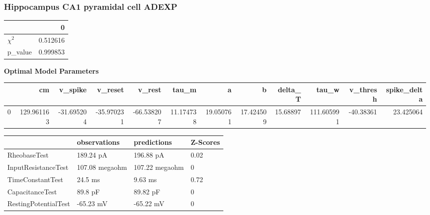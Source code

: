 \subsubsection{Hippocampus CA1 pyramidal cell ADEXP}\begin{tabular}{lr}
\toprule
{} &         0 \\
\midrule
$\chi^{2}$ &  0.512616 \\
p\_value    &  0.999853 \\
\bottomrule
\end{tabular}
\textbf{Optimal Model Parameters} \begin{tabular}{lrrrrrrrrrrr}
\toprule
{} &          cm &    v\_spike &    v\_reset &     v\_rest &      tau\_m &          a &          b &   delta\_T &       tau\_w &  v\_thresh &  spike\_delta \\
\midrule
0 &  129.961163 & -31.695204 & -35.970231 & -66.538207 &  11.174738 &  19.050761 &  17.424509 &  15.68897 &  111.605991 & -40.38361 &    23.425064 \\
\bottomrule
\end{tabular}
\begin{tabular}{llll}
\toprule
{} &    observations &     predictions & Z-Scores \\
\midrule
RheobaseTest         &       189.24 pA &       196.88 pA &     0.02 \\
InputResistanceTest  &  107.08 megaohm &  107.22 megaohm &        0 \\
TimeConstantTest     &         24.5 ms &         9.63 ms &     0.72 \\
CapacitanceTest      &         89.8 pF &        89.82 pF &        0 \\
RestingPotentialTest &       -65.23 mV &       -65.22 mV &        0 \\
\bottomrule
\end{tabular}
